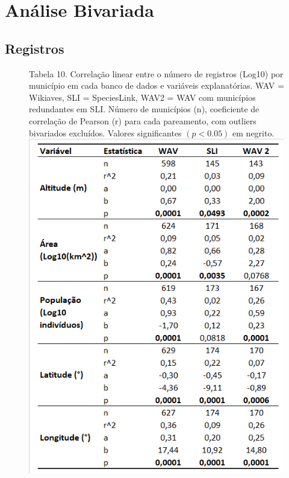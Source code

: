 \section{Análise Bivariada}

\subsection{Registros}

\begin{figure}[h!]
\centering
{\scriptsize Tabela 10. Correlação linear entre o número de registros (Log10) por município em cada banco de dados e variáveis explanatórias. WAV = Wikiaves, SLI = SpeciesLink, WAV2 = WAV com municípios redundantes em SLI. Número de municípios (n), coeficiente de correlação de Pearson (r) para cada pareamento, com outliers bivariados excluídos. Valores significantes $(p < 0.05)$ em negrito. }
\\
\includegraphics{Tabelas/10.png}
\end{figure}

